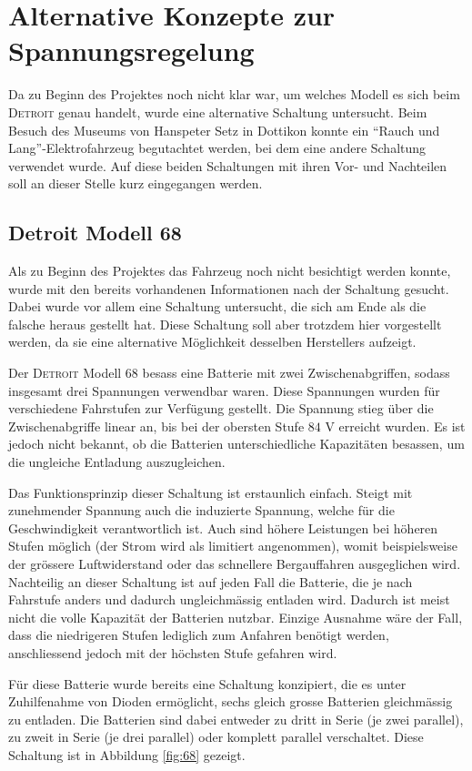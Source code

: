 \section{Alternative Konzepte zur Spannungsregelung}
Da zu Beginn des Projektes noch nicht klar war, um welches Modell es sich beim \textsc{Detroit} genau handelt, wurde eine alternative Schaltung untersucht. Beim Besuch des Museums von Hanspeter Setz in Dottikon konnte ein "`Rauch und Lang"'-Elektrofahrzeug begutachtet werden, bei dem eine andere Schaltung verwendet wurde. Auf diese beiden Schaltungen mit ihren Vor- und Nachteilen soll an dieser Stelle kurz eingegangen werden.

\subsection{Detroit Modell 68}
Als zu Beginn des Projektes das Fahrzeug noch nicht besichtigt werden konnte, wurde mit den bereits vorhandenen Informationen nach der Schaltung gesucht. Dabei wurde vor allem eine Schaltung untersucht, die sich am Ende als die falsche heraus gestellt hat. Diese Schaltung soll aber trotzdem hier vorgestellt werden, da sie eine alternative Möglichkeit desselben Herstellers aufzeigt.

Der \textsc{Detroit} Modell 68 besass eine Batterie mit zwei Zwischenabgriffen, sodass insgesamt drei Spannungen verwendbar waren. Diese Spannungen wurden für verschiedene Fahrstufen zur Verfügung gestellt. Die Spannung stieg über die Zwischenabgriffe linear an, bis bei der obersten Stufe $84$ V erreicht wurden. Es ist jedoch nicht bekannt, ob die Batterien unterschiedliche Kapazitäten besassen, um die ungleiche Entladung auszugleichen.

Das Funktionsprinzip dieser Schaltung ist erstaunlich einfach. Steigt mit zunehmender Spannung auch die induzierte Spannung, welche für die Geschwindigkeit verantwortlich ist. Auch sind höhere Leistungen bei höheren Stufen möglich (der Strom wird als limitiert angenommen), womit beispielsweise der grössere Luftwiderstand oder das schnellere Bergauffahren ausgeglichen wird. Nachteilig an dieser Schaltung ist auf jeden Fall die Batterie, die je nach Fahrstufe anders und dadurch ungleichmässig entladen wird. Dadurch ist meist nicht die volle Kapazität der Batterien nutzbar. Einzige Ausnahme wäre der Fall, dass die niedrigeren Stufen lediglich zum Anfahren benötigt werden, anschliessend jedoch mit der höchsten Stufe gefahren wird.

Für diese Batterie wurde bereits eine Schaltung konzipiert, die es unter Zuhilfenahme von Dioden ermöglicht, sechs gleich grosse Batterien gleichmässig zu entladen. Die Batterien sind dabei entweder zu dritt in Serie (je zwei parallel), zu zweit in Serie (je drei parallel) oder komplett parallel verschaltet. Diese Schaltung ist in Abbildung \ref{fig:68} gezeigt.

